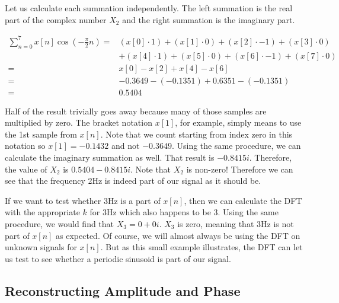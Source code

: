 \noindent Let us calculate each summation independently.  The left summation is the real part of the complex number $X_2$
and the right summation is the imaginary part.  

\begin{align*}
	\sum_{n = 0}^{7}x[n]\cos{(-\frac{\pi}{2}n)} =  & (x[0] \cdot 1) + (x[1] \cdot 0) + (x[2] \cdot -1) + (x[3] \cdot 0)\\
	& + (x[4] \cdot 1) + (x[5] \cdot 0) + (x[6] \cdot -1) + (x[7] \cdot 0)\\
	=  & x[0] - x[2] + x[4] - x[6] \\
	=  & -0.3649 - (-0.1351) + 0.6351 - (-0.1351) \\
	= & 0.5404
\end{align*}

Half of the result trivially goes away because many of those samples are multiplied by zero.  The bracket notation
$x[1]$, for example, simply means to use the 1st sample from $x[n]$.  Note that we count starting from index zero
in this notation so $x[1] = -0.1432$ and not $-0.3649$.  Using the same procedure, we can calculate
the imaginary summation as well.  That result is $-0.8415i$.  Therefore, the value of 
$X_2$ is $0.5404 - 0.8415i$.  Note that $X_2$ is non-zero!  Therefore we can see that the frequency 2Hz is
indeed part of our signal as it should be.

If we want to test whether 3Hz is a part of $x[n]$, then we can calculate the DFT with the appropriate $k$ for
3Hz which also happens to be 3.  Using the same procedure, we would find that $X_3 = 0 + 0i$.  $X_3$ is
zero, meaning that 3Hz is not part of $x[n]$ as expected.  Of course, we will almost always be using the
DFT on unknown signals for $x[n]$.  But as this small example illustrates, the DFT can let us test to see 
whether a periodic sinusoid is part of our signal.

\subsection*{Reconstructing Amplitude and Phase}

